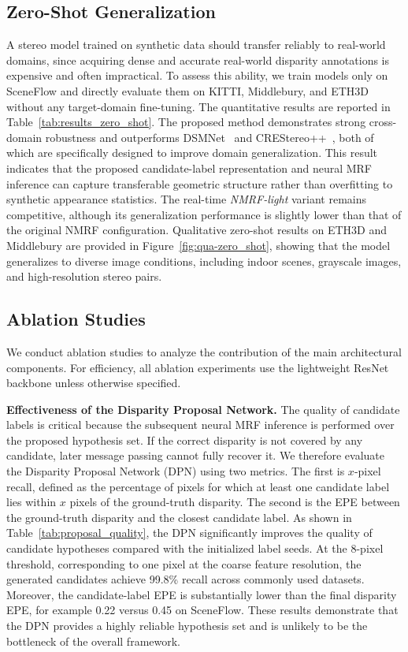 \subsection{Zero-Shot Generalization}

A stereo model trained on synthetic data should transfer reliably to real-world domains, since acquiring dense and accurate real-world disparity annotations is expensive and often impractical.
To assess this ability, we train models only on SceneFlow and directly evaluate them on KITTI, Middlebury, and ETH3D without any target-domain fine-tuning.
The quantitative results are reported in Table~\ref{tab:results_zero_shot}.
The proposed method demonstrates strong cross-domain robustness and outperforms DSMNet~\cite{zhang2020domain} and CREStereo++~\cite{jing2023uncertainty}, both of which are specifically designed to improve domain generalization.
This result indicates that the proposed candidate-label representation and neural MRF inference can capture transferable geometric structure rather than overfitting to synthetic appearance statistics.
The real-time \emph{NMRF-light} variant remains competitive, although its generalization performance is slightly lower than that of the original NMRF configuration.
Qualitative zero-shot results on ETH3D and Middlebury are provided in Figure~\ref{fig:qua-zero_shot}, showing that the model generalizes to diverse image conditions, including indoor scenes, grayscale images, and high-resolution stereo pairs.


\subsection{Ablation Studies}
We conduct ablation studies to analyze the contribution of the main architectural components.
For efficiency, all ablation experiments use the lightweight ResNet backbone unless otherwise specified.

\noindent\textbf{Effectiveness of the Disparity Proposal Network.} The quality of candidate labels is critical because the subsequent neural MRF inference is performed over the proposed hypothesis set.
If the correct disparity is not covered by any candidate, later message passing cannot fully recover it.
We therefore evaluate the Disparity Proposal Network (DPN) using two metrics.
The first is $x$-pixel recall, defined as the percentage of pixels for which at least one candidate label lies within $x$ pixels of the ground-truth disparity.
The second is the EPE between the ground-truth disparity and the closest candidate label.
As shown in Table~\ref{tab:proposal_quality}, the DPN significantly improves the quality of candidate hypotheses compared with the initialized label seeds.
At the 8-pixel threshold, corresponding to one pixel at the coarse feature resolution, the generated candidates achieve 99.8\% recall across commonly used datasets.
Moreover, the candidate-label EPE is substantially lower than the final disparity EPE, for example 0.22 versus 0.45 on SceneFlow.
These results demonstrate that the DPN provides a highly reliable hypothesis set and is unlikely to be the bottleneck of the overall framework.


